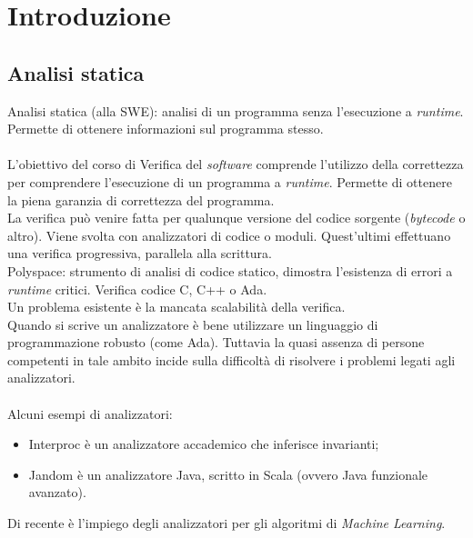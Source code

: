 \documentclass[10pt,                    %
               a4paper,                 %
               twoside,                 %
               openright,               %
               english,                 
               italian,                 
               ]{book}
\begin{document}
\chapter{Introduzione}

\section{Analisi statica}
Analisi statica (alla SWE): analisi di un programma senza l'esecuzione a \textit{runtime}. Permette di ottenere informazioni sul programma stesso.
\\\\
L'obiettivo del corso di Verifica del \textit{software} comprende l'utilizzo della correttezza per comprendere l'esecuzione di un programma a \textit{runtime}. Permette di ottenere la piena garanzia di correttezza del programma.\\
La verifica pu\`o venire fatta per qualunque versione del codice sorgente (\textit{bytecode} o altro). Viene svolta con analizzatori di codice o moduli. Quest'ultimi effettuano una verifica progressiva, parallela alla scrittura.
\\
Polyspace: strumento di analisi di codice statico, dimostra l'esistenza di errori a \textit{runtime} critici. Verifica codice C, C++ o Ada.\\
Un problema esistente \`e la mancata scalabilit\`a della verifica.\\
Quando si scrive un analizzatore \`e bene utilizzare un linguaggio di programmazione robusto (come Ada).
Tuttavia la quasi assenza di persone competenti in tale ambito incide sulla difficolt\`a di risolvere i problemi legati agli analizzatori.\\\\
Alcuni esempi di analizzatori:
\begin{itemize}
\item Interproc \`e un analizzatore accademico che inferisce invarianti;
\item Jandom \`e un analizzatore Java, scritto in Scala (ovvero Java funzionale avanzato).
\end{itemize}
\noindent
Di recente \`e l'impiego degli analizzatori per gli algoritmi di \textit{Machine Learning}.
\end{document}
